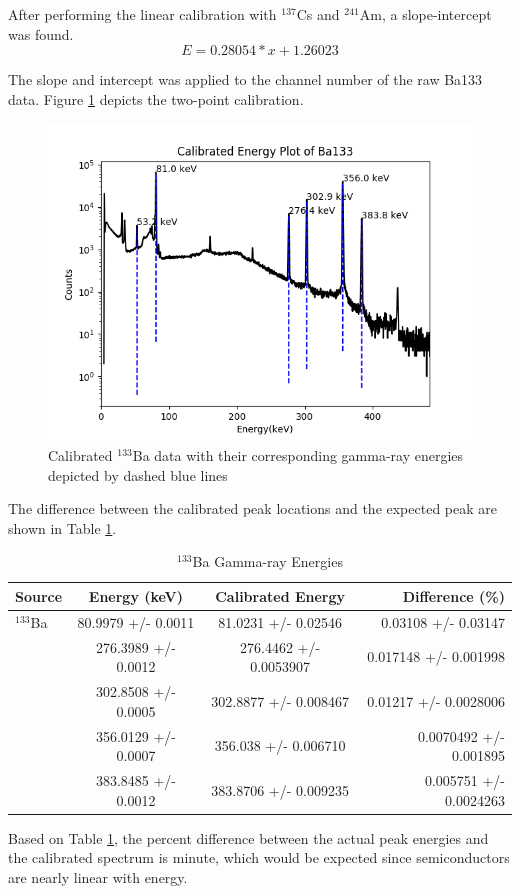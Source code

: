 After performing the linear calibration with $^{137}$Cs and $^{241}$Am,
a slope-intercept was found.
\vspace{5mm} %
\begin{equation}
E = 0.28054*x + 1.26023
\end{equation}
\vspace{5mm} %

The slope and intercept was applied to the channel number of the raw Ba133 data.
Figure \ref{fig:CE} depicts the two-point calibration.

\begin{figure}[H]
\centering
\includegraphics[scale=0.8]{images/Ba133_calibrated.png}
\caption{Calibrated $^{133}$Ba data with their corresponding gamma-ray energies
depicted by dashed blue lines}
\label{fig:CE}
\end{figure}

The difference between the calibrated peak locations and the expected peak
are shown in Table \ref{table:difference}.

\begin{table}[H]
\caption{$^{133}$Ba Gamma-ray Energies}
\begin{center}
\begin{tabular}{|l|c|c|r|}
\textbf{Source} & \textbf{Energy (keV)} & \textbf{Calibrated Energy} & \textbf{Difference (\%)}\\
\hline
$^{133}$Ba    &  80.9979 +/- 0.0011  & 81.0231 +/- 0.02546 & 0.03108 +/- 0.03147 \\
              &  276.3989 +/- 0.0012 & 276.4462 +/- 0.0053907 & 0.017148 +/- 0.001998 \\
              & 302.8508 +/- 0.0005 & 302.8877 +/- 0.008467 & 0.01217 +/- 0.0028006  \\
              & 356.0129 +/- 0.0007 & 356.038 +/- 0.006710 & 0.0070492 +/- 0.001895 \\
              & 383.8485 +/- 0.0012 & 383.8706 +/- 0.009235 & 0.005751 +/- 0.0024263 \\
\hline
\end{tabular}
\end{center}
\label{table:difference}
\end{table}

Based on Table \ref{table:difference}, the percent difference between the actual peak energies
and the calibrated spectrum is minute, which would be expected since semiconductors are nearly
linear with energy.
